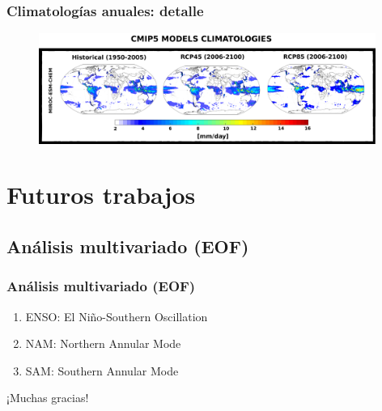 \documentclass{beamer}
\begin{document}
		\begin{frame}
			\frametitle{Climatologías anuales: detalle}
			\begin{figure}[!hbt]
		   		\centering
		   		\includegraphics[width=11cm]{detalle-graficas.png}
			\end{figure}
		\end{frame}

	\section{Futuros trabajos}
	\subsection{Análisis multivariado (EOF)}
	\begin{frame}
		\frametitle{Análisis multivariado (EOF)}
		\begin{enumerate}
			\item ENSO: El Niño-Southern Oscillation \pause
			\item NAM: Northern Annular Mode\pause
			\item SAM: Southern Annular Mode
		\end{enumerate}

	\end{frame} 

	\begin{frame}
		\begin{center}
			\Huge ¡Muchas gracias!
		\end{center}
	\end{frame}
\end{document}
